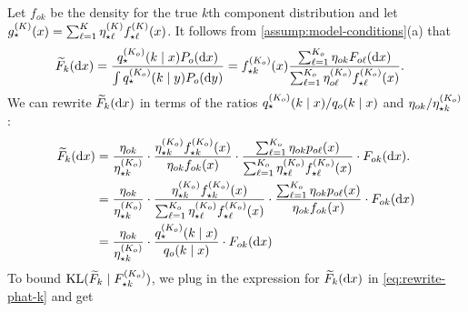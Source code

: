 Let $f_{ok}$ be the density for the true $k$th component distribution and let $g^{(K)}_{\star}(x) =\sum_{\ell=1}^{K}\eta^{(K)}_{\star\ell}f^{(K)}_{\star\ell}(x)$.
It follows from \cref{assump:model-conditions}(a) that
\begin{align}
	\widetilde{F}_{k}(\dee x) & = \frac{q_{\star}^{(\numcomps_{o})}(k \mid x)P_o(\dee x) }{\int q_{\star}^{(\numcomps_{o})}(k \mid y)P_o(\dee y)} \label{appx-eq:phat-def}  = f^{(\numcomps_{o})}_{\opt k}(x) \frac{\sum_{\ell=1}^{\numcomps_{o}}\eta_{ok}F_{o\ell}(\dee x)}{\sum_{\ell=1}^{\numcomps_{o}}\eta^{(\numcomps_{o})}_{o \ell} f^{(\numcomps_{o})}_{\opt\ell}(x)}.
\end{align}
We can rewrite $\widetilde{F}_{k}(\mathrm{d} x) $ in terms of the ratios $q_{\star}^{(K_{o})}(k \mid x)/q_{o}(k \mid x)$ and $\eta_{ok}/\eta^{(K_{o})}_{\star k}$:
\begin{align}
	\widetilde{F}_{k}(\dee x) & =  \frac{\eta_{ok}}{\eta^{(\numcomps_{o})}_{\star k}}\cdot  \frac{\eta^{(\numcomps_{o})}_{\star k}f_{\star k}^{(\numcomps_{o})}(x)}{\eta_{ok}f_{ok}(x)}\cdot \frac{\sum_{\ell=1}^{\numcomps_{o}}\eta_{ok}p_{o\ell}(x)}{\sum_{\ell=1}^{\numcomps_{o}}\eta^{(\numcomps_{o})}_{\star \ell}f_{\star \ell}^{(\numcomps_{o})}(x)}\cdot F_{ok}(\dee x). \\
	                      & = \frac{\eta_{ok}}{\eta^{(\numcomps_{o})}_{\star k}} \cdot \frac{\eta^{(\numcomps_{o})}_{\star k}f_{\star k}^{(\numcomps_{o})}(x)}{\sum_{\ell=1}^{\numcomps_{o}}\eta^{(\numcomps_{o})}_{\star \ell}f_{\star \ell}^{(\numcomps_{o})}(x)} \cdot \frac{\sum_{\ell=1}^{\numcomps_{o}}\eta_{ok}p_{o\ell}(x)}{\eta_{ok}f_{ok}(x)}\cdot F_{ok}(\dee x)  \\
	                      & = \frac{\eta_{ok}}{\eta^{(\numcomps_{o})}_{\star k}}\cdot \frac{q_{\star}^{(\numcomps_{o})}(k \mid x)}{q_{o}(k \mid x)}\cdot F_{ok}(\dee x) \label{eq:rewrite-phat-k}
\end{align}
To bound $\mathrm{KL}(\widetilde{F}_{k} \mid F^{(K_{o})}_{\star k})$, we plug in the expression for $	\widetilde{F}_{k}(\mathrm{d} x)$ in \cref{eq:rewrite-phat-k} and get
